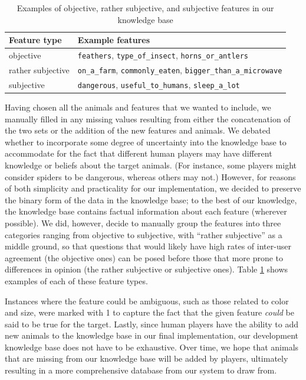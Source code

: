 \documentclass[11pt,a4paper]{article}
\begin{document}
\begin{table}
    \centering
    \begin{tabular}{ll}
    \toprule
    Feature type & Example features \\ 
    \midrule
         objective &  \texttt{feathers}, \texttt{type\_of\_insect}, \texttt{horns\_or\_antlers} \\
         rather subjective & \texttt{on\_a\_farm}, \texttt{commonly\_eaten}, \texttt{bigger\_than\_a\_microwave} \\
         subjective & \texttt{dangerous}, \texttt{useful\_to\_humans}, \texttt{sleep\_a\_lot}\\
    \bottomrule
    \end{tabular}
    \caption{Examples of objective, rather subjective, and subjective features in our knowledge base}
    \label{tab:feature-types}
\end{table}

Having chosen all the animals and features that we wanted to include, we manually filled in any missing values resulting from either the concatenation of the two sets or the addition of the new features and animals. 
We debated whether to incorporate some degree of uncertainty into the knowledge base to accommodate for the fact that different human players may have different knowledge or beliefs about the target animals. 
(For instance, some players might consider spiders to be dangerous, whereas others may not.) 
However, for reasons of both simplicity and practicality for our implementation, we decided to preserve the binary form of the data in the knowledge base; to the best of our knowledge, the knowledge base contains factual information about each feature (wherever possible). 
We did, however, decide to manually group the features into three categories ranging from objective to subjective, with ``rather subjective'' as a middle ground, so that questions that would likely have high rates of inter-user agreement (the objective ones) can be posed before those that more prone to differences in opinion (the rather subjective or subjective ones). 
Table \ref{tab:feature-types} shows examples of each of these feature types.

Instances where the feature could be ambiguous, such as those related to color and size, were marked with 1 to capture the fact that the given feature \textit{could} be said to be true for the target.
Lastly, since human players have the ability to add new animals to the knowledge base in our final implementation, our development knowledge base does not have to be exhaustive. 
Over time, we hope that animals that are missing from our knowledge base will be added by players, ultimately resulting in a more comprehensive database from our system to draw from.
\end{document}
